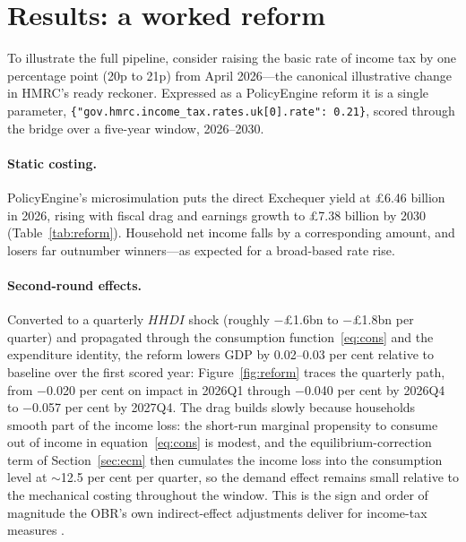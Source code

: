 \section{Results: a worked reform}
\label{sec:results}

To illustrate the full pipeline, consider raising the basic rate of income tax by one percentage point (20p to 21p) from April 2026---the canonical illustrative change in HMRC's ready reckoner. Expressed as a PolicyEngine reform it is a single parameter, \texttt{\{"gov.hmrc.\allowbreak income\_tax.\allowbreak rates.\allowbreak uk[0].\allowbreak rate":\allowbreak\ 0.21\}}, scored through the bridge over a five-year window, 2026--2030.

\paragraph{Static costing.} PolicyEngine's microsimulation puts the direct Exchequer yield at \pounds 6.46 billion in 2026, rising with fiscal drag and earnings growth to \pounds 7.38 billion by 2030 (Table~\ref{tab:reform}). Household net income falls by a corresponding amount, and losers far outnumber winners---as expected for a broad-based rate rise.

\paragraph{Second-round effects.} Converted to a quarterly $HHDI$ shock (roughly $-$\pounds 1.6bn to $-$\pounds 1.8bn per quarter) and propagated through the consumption function~\eqref{eq:cons} and the expenditure identity, the reform lowers GDP by 0.02--0.03 per cent relative to baseline over the first scored year: Figure~\ref{fig:reform} traces the quarterly path, from $-$0.020 per cent on impact in 2026Q1 through $-$0.040 per cent by 2026Q4 to $-$0.057 per cent by 2027Q4. The drag builds slowly because households smooth part of the income loss: the short-run marginal propensity to consume out of income in equation~\eqref{eq:cons} is modest, and the equilibrium-correction term of Section~\ref{sec:ecm} then cumulates the income loss into the consumption level at $\sim$12.5 per cent per quarter, so the demand effect remains small relative to the mechanical costing throughout the window. This is the sign and order of magnitude the OBR's own indirect-effect adjustments deliver for income-tax measures \citep{obr2014costings}.

